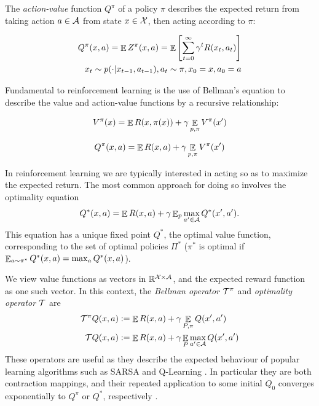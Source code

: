 The \textit{action-value} function $Q^\pi$ of a policy $\pi$ describes the expected return from taking action $a \in \mathcal{A}$ from state $x \in \mathcal{X}$, then acting according to $\pi$:

\begin{equation}
\begin{split}
Q^\pi(x, a) = \mathop{\mathbb{E}} Z^\pi(x, a) = \mathop{\mathbb{E}}\left[ \sum_{t=0}^\infty \gamma^tR(x_t,a_t) \right]\\
x_t \sim p(\cdot|x_{t-1}, a_{t-1}), a_t \sim \pi, x_0 = x, a_0 = a
\end{split}
\end{equation}

Fundamental to reinforcement learning is the use of Bellman’s equation \citep{bellman1957markovian} to describe the value and action-value functions by a recursive relationship:

\begin{equation}
V^\pi(x) = \mathop{\mathbb{E}} R(x, \pi(x)) + \gamma \mathop{\mathbb{E}}\limits_{p, \pi}V^\pi(x')
\end{equation}

\begin{equation}
Q^\pi(x, a) = \mathop{\mathbb{E}} R(x, a) + \gamma \mathop{\mathbb{E}}_{p, \pi}V^\pi(x')
\end{equation}

In reinforcement learning we are typically interested in acting so as to maximize the expected return. The most common approach for doing so involves the optimality equation
\begin{equation*}
Q^*(x,a) = \mathop{\mathbb{E}} R(x,a) + \gamma \mathop{\mathbb{E}}\nolimits_p \max_{a' \in \mathcal{A}} Q^*(x', a') .
\end{equation*}
This equation has a unique fixed point $Q^*$, the optimal value function, corresponding to the set of optimal policies $\Pi^*$ ($\pi^*$ is optimal if $\mathop{\mathbb{E}}_{a \sim \pi^*} Q^*(x, a) = \max_a Q^*(x,a)$).

We view value functions as vectors in $\mathbb{R}^{\mathcal{X} \times \mathcal{A}}$, and the expected reward function as one such vector. In this context, the \emph{Bellman operator} $\mathcal{T}^\pi$ and \emph{optimality operator} $\mathcal{T}$ are
\begin{align}
\mathcal{T}^\pi Q(x,a) &:= \mathop{\mathbb{E}} R(x,a) + \gamma \mathop{\mathbb{E}}_{P, \pi} Q(x',a')\\
\mathcal{T} Q(x,a) &:= \mathop{\mathbb{E}} R(x,a) + \gamma \mathop{\mathbb{E}}_{P} \max_{a' \in \mathcal{A}} Q(x', a')
\end{align}
These operators are useful as they describe the expected behaviour of popular learning algorithms such as SARSA and Q-Learning \cite{sutton1998reinforcement}. In particular they are both contraction mappings, and their repeated application to some initial $Q_0$ converges exponentially to $Q^\pi$ or $Q^*$, respectively \citep{bertsekas1995neuro}.

